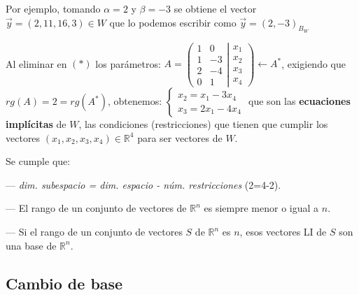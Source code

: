 \begin{cuadro-gris}
\noindent Por ejemplo, tomando $\alpha=2$ y $\beta=-3$ se obtiene el vector $\vec y=(2,11,16,3) \in W$ que lo  podemos escribir como $\vec y=(2,-3)_{B_W}$

\noindent Al eliminar en $(*)$ los parámetros: $A=\left( \begin{matrix} \boxed{1}&\boxed{0}\\1&-3\\2&-4\\\boxed{0}&\boxed{1} \end{matrix} \right| \left. \begin{matrix} x_1\\x_2\\x_3\\x_4 \end{matrix} \right) \leftarrow A^*$, exigiendo que $rg(A)=2=rg(A^*)$, obtenemos: $\begin{cases} x_2=x_1-3x_4\\x_3=2x_1-4x_4 \end{cases}$ que son las \textbf{ecuaciones implícitas} de $W$, las condiciones (restricciones) que tienen que cumplir los vectores $(x_1,x_2,x_3,x_4) \in \mathbb R^4$ para ser vectores de $W$.



\noindent Se cumple que:

--- \emph{dim. subespacio = dim. espacio - núm. restricciones} \tiny{(2=4-2)}\normalsize{.}

--- El rango de un conjunto de vectores de $\mathbb R^n$ es siempre menor o igual a $n$.

--- Si el rango de un conjunto de vectores $S$ de $\mathbb R^n$ es $n$, esos vectores LI de $S$ son una base de $\mathbb R^n$.

\end{cuadro-gris}

\subsection{Cambio de base}
\label{matriz-cambio-base}


